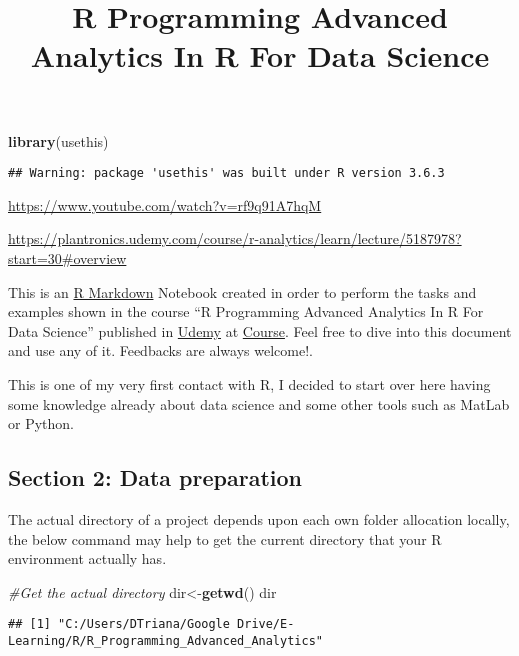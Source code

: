 \documentclass[]{article}
\title{R Programming Advanced Analytics In R For Data Science}
\author{}
\date{\vspace{-2.5em}}
\newenvironment{Shaded}{\begin{snugshade}}{\end{snugshade}}
\newcommand{\CommentTok}[1]{\textcolor[rgb]{0.56,0.35,0.01}{\textit{#1}}}
\newcommand{\KeywordTok}[1]{\textcolor[rgb]{0.13,0.29,0.53}{\textbf{#1}}}
\newcommand{\NormalTok}[1]{#1}
\begin{document}
\maketitle

\begin{Shaded}
\begin{Highlighting}[]
\KeywordTok{library}\NormalTok{(usethis)}
\end{Highlighting}
\end{Shaded}

\begin{verbatim}
## Warning: package 'usethis' was built under R version 3.6.3
\end{verbatim}

\url{https://www.youtube.com/watch?v=rf9q91A7hqM}

\url{https://plantronics.udemy.com/course/r-analytics/learn/lecture/5187978?start=30\#overview}

This is an \href{http://rmarkdown.rstudio.com}{R Markdown} Notebook
created in order to perform the tasks and examples shown in the course
``R Programming Advanced Analytics In R For Data Science'' published in
\href{https://www.udemy.com/}{Udemy} at
\href{https://www.udemy.com/course/r-analytics/}{Course}. Feel free to
dive into this document and use any of it. Feedbacks are always
welcome!.

This is one of my very first contact with R, I decided to start over
here having some knowledge already about data science and some other
tools such as MatLab or Python.

\hypertarget{section-2-data-preparation}{%
\subsection{Section 2: Data
preparation}\label{section-2-data-preparation}}

The actual directory of a project depends upon each own folder
allocation locally, the below command may help to get the current
directory that your R environment actually has.

\begin{Shaded}
\begin{Highlighting}[]
\CommentTok{#Get the actual directory}
\NormalTok{dir<-}\KeywordTok{getwd}\NormalTok{()}
\NormalTok{dir}
\end{Highlighting}
\end{Shaded}

\begin{verbatim}
## [1] "C:/Users/DTriana/Google Drive/E-Learning/R/R_Programming_Advanced_Analytics"
\end{verbatim}
\end{document}
